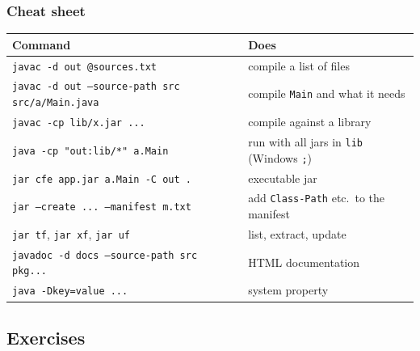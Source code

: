 \documentclass[aspectratio=169,10pt,compress]{beamer}
\begin{document}
\begin{frame}[t,fragile] \frametitle{Cheat sheet}
  \footnotesize
  \begin{tabular}{@{}L{0.5\textwidth}L{0.42\textwidth}@{}}
    \toprule
    \textbf{Command} & \textbf{Does} \\
    \midrule
    \texttt{javac -d out @sources.txt}                          & compile a list of files \\
    \texttt{javac -d out --source-path src src/a/Main.java}     & compile \texttt{Main} and what it needs \\
    \texttt{javac -cp lib/x.jar ...}                            & compile against a library \\
    \texttt{java -cp "out:lib/*" a.Main}                        & run with all jars in \texttt{lib} (Windows \texttt{;}) \\
    \texttt{jar cfe app.jar a.Main -C out .}                    & executable jar \\
    \texttt{jar --create ... --manifest m.txt}                  & add \texttt{Class-Path} etc.\ to the manifest \\
    \texttt{jar tf}, \texttt{jar xf}, \texttt{jar uf}           & list, extract, update \\
    \texttt{javadoc -d docs --source-path src pkg...}           & HTML documentation \\
    \texttt{java -Dkey=value ...}                               & system property \\
    \bottomrule
  \end{tabular}
\end{frame}

\subsection[Exercises]{Exercises}
\end{document}
